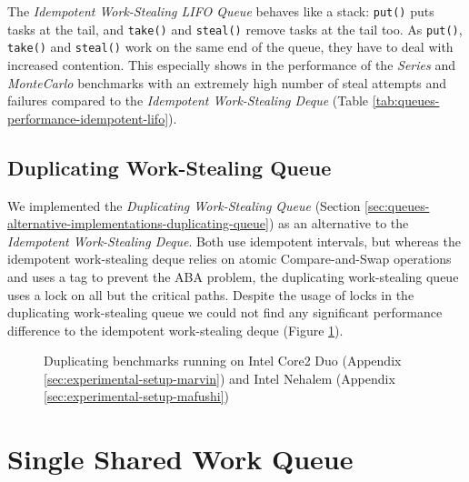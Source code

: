The \emph{Idempotent Work-Stealing LIFO Queue} behaves like a stack:
\lstinline!put()! puts tasks at the tail, and \lstinline!take()!  and
\lstinline!steal()! remove tasks at the tail too. As
\lstinline!put()!, \lstinline!take()! and \lstinline!steal()! work on
the same end of the queue, they have to deal with increased
contention. This especially shows in the performance of the
\emph{Series} and \emph{MonteCarlo} benchmarks with an extremely high
number of steal attempts and failures compared to the \emph{Idempotent
  Work-Stealing Deque} (Table
\ref{tab:queues-performance-idempotent-lifo}).

\subsection{Duplicating Work-Stealing Queue}
\label{sec:performance-alternative-duplicating}

We implemented the \emph{Duplicating Work-Stealing Queue} (Section
\ref{sec:queues-alternative-implementations-duplicating-queue}) as an
alternative to the \emph{Idempotent Work-Stealing Deque}. Both use
idempotent intervals, but whereas the idempotent work-stealing deque
relies on atomic Compare-and-Swap operations and uses a tag to prevent
the ABA problem, the duplicating work-stealing queue uses a lock on
all but the critical paths. Despite the usage of locks in the
duplicating work-stealing queue we could not find any significant
performance difference to the idempotent work-stealing deque (Figure
\ref{fig:queues-performance-duplicating}).

\begin{figure}[!htb]
  \centering
  \caption[Duplicating work-stealing deques benchmark
  results]{Duplicating benchmarks running on Intel Core2 Duo (Appendix
    \ref{sec:experimental-setup-marvin}) and Intel Nehalem (Appendix
    \ref{sec:experimental-setup-mafushi})}
  \label{fig:queues-performance-duplicating}
\end{figure}


\section{Single Shared Work Queue}
\label{sec:queues-performance-single-shared-queue}

